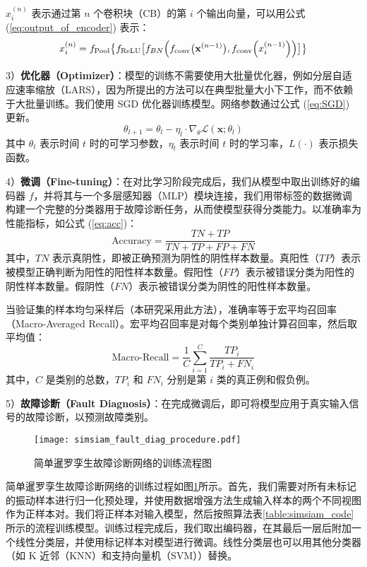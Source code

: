 \documentclass[master]{thesis-uestc}
\begin{document}
\( x_i^{(n)} \) 表示通过第 \( n \) 个卷积块（CB）的第 \( i \) 个输出向量，可以用公式 (\ref{eq:output_of_encoder}) 表示：
\begin{equation}
    \begin{aligned}
    x_i^{(n)} = f_{\text{Pool}}\bigl\{f_{\text{ReLU}}\bigl[f_{BN}\Bigl(f_{\text{conv}}\bigl(\mathbf{x}^{(n-1)}\bigr), f_{\text{conv}}\Bigl(x_i^{(n-1)}\Bigr)\Bigr)\bigr]\bigr\}
    \end{aligned}
    \label{eq:output_of_encoder}
\end{equation}

3）\textbf{优化器（Optimizer）}：模型的训练不需要使用大批量优化器，例如分层自适应速率缩放（LARS），因为所提出的方法可以在典型批量大小下工作，而不依赖于大批量训练。我们使用 SGD 优化器训练模型。网络参数通过公式 (\ref{eq:SGD}) 更新。
\begin{equation}
    \theta_{l+1} = \theta_l - \eta_l \cdot \nabla_{\theta} \mathcal{L}(\mathbf{x}; \theta_l)
\label{eq:SGD}
\end{equation}
其中 \( \theta_t \) 表示时间 \( t \) 时的可学习参数，\( \eta_t \) 表示时间 \( t \) 时的学习率，\( L(\cdot) \) 表示损失函数。

4）\textbf{微调（Fine-tuning）}：在对比学习阶段完成后，我们从模型中取出训练好的编码器 \( f \)，并将其与一个多层感知器（MLP）模块连接，我们用带标签的数据微调构建一个完整的分类器用于故障诊断任务，从而使模型获得分类能力。以准确率为性能指标，如公式 (\ref{eq:acc})：
\begin{equation}
    \text{Accuracy} = \frac{TN + TP}{TN + TP + FP + FN}
    \label{eq:acc}
\end{equation}
其中，\( TN \) 表示真阴性，即被正确预测为阴性的阴性样本数量。真阳性（\( TP \)）表示被模型正确判断为阳性的阳性样本数量。假阳性（\( FP \)）表示被错误分类为阳性的阴性样本数量。假阴性（\( FN \)）表示被错误分类为阴性的阳性样本数量。  

当验证集的样本均匀采样后（本研究采用此方法），准确率等于宏平均召回率（Macro-Averaged Recall）。宏平均召回率是对每个类别单独计算召回率，然后取平均值：
\begin{equation}
    \text{Macro-Recall} = \frac{1}{C} \sum_{i=1}^{C} \frac{TP_i}{TP_i + FN_i}
    \label{eq:macro_recall}
\end{equation}
其中，\( C \) 是类别的总数，\( TP_i \) 和 \( FN_i \) 分别是第 \( i \) 类的真正例和假负例。




5）\textbf{故障诊断（Fault Diagnosis）}：在完成微调后，即可将模型应用于真实输入信号的故障诊断，以预测故障类别。
\begin{figure}[h]
    \centering
    \texttt{[image: simsiam\_fault\_diag\_procedure.pdf]}
    \caption{简单暹罗孪生故障诊断网络的训练流程图}
    \label{simsiam_fault_diag_procedure}
\end{figure}
简单暹罗孪生故障诊断网络的训练过程如图\ref{simsiam_fault_diag_procedure}所示。首先，我们需要对所有未标记的振动样本进行归一化预处理，并使用数据增强方法生成输入样本的两个不同视图作为正样本对。我们将正样本对输入模型，然后按照算法表\ref{table:simsiam_code}所示的流程训练模型。训练过程完成后，我们取出编码器，在其最后一层后附加一个线性分类层，并使用标记样本对模型进行微调。线性分类层也可以用其他分类器（如 K 近邻（KNN）和支持向量机（SVM））替换。
\end{document}
